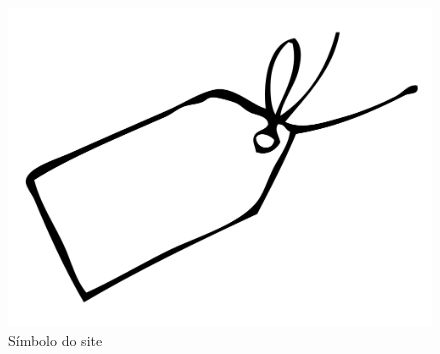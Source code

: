 \begin{figure}[H]
    \begin{center}
        \includegraphics[width=12cm]{Pictures/JV/10_TagLogo.png}
        \caption{Símbolo do site} \label{Símbolo}
    \end{center}
\end{figure} 

